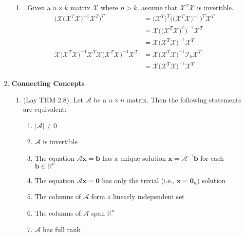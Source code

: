 \documentclass[12pt]{article}
\begin{document}
\begin{enumerate}
\begin{enumerate}
	\item\underline{}. Given a $n \times k$ matrix $\mathcal{X}$ where $n>k$, assume that $\mathcal{X}^T \mathcal{X}$ is invertible. 
		\begin{align*}
			\Big( \mathcal{X} \big(\mathcal{X}^T \mathcal{X} \big)^{-1} \mathcal{X}^T \Big)^T &= \big(\mathcal{X}^T\big)^T \Big( \big(\mathcal{X}^T \mathcal{X} \big)^{-1} \Big)^{T} \mathcal{X}^T \\ 
			& = \mathcal{X} \Big( \big(\mathcal{X}^T \mathcal{X} \big)^{T} \Big)^{-1} \mathcal{X}^T \\ 
			& = \mathcal{X} \big(\mathcal{X}^T \mathcal{X} \big)^{-1} \mathcal{X}^T \tag{Symmetric} \\
			\mathcal{X} \big(\mathcal{X}^T \mathcal{X} \big)^{-1} \mathcal{X}^T \mathcal{X} \big(\mathcal{X}^T \mathcal{X} \big)^{-1} \mathcal{X}^T  &= \mathcal{X} \big(\mathcal{X}^T \mathcal{X} \big)^{-1} \mathcal{I}_k \mathcal{X}^T \\
			& = \mathcal{X} \big(\mathcal{X}^T \mathcal{X} \big)^{-1} \mathcal{X}^T  \tag{Idempotent} 
		\end{align*}

	\end{enumerate}

\newpage

\item\textbf{Connecting Concepts}
	\begin{enumerate}
	\item\underline{} (Lay THM 2.8).
		Let $\mathcal{A}$ be a $n\times n$ matrix. Then the following statements are equivalent:
		\begin{enumerate}
		\item $|\mathcal{A}|\neq0$
		\item $\mathcal{A}$ is invertible
		\item The equation $\mathcal{A}\mathbf{x}=\mathbf{b}$ has a unique solution $\mathbf{x}=\mathcal{A}^{-1}\mathbf{b}$ for each $\mathbf{b}\in\mathbb{R}^n$
		\item The equation $\mathcal{A}\mathbf{x}=\mathbf{0}$ has only the trivial (i.e., $\mathbf{x}=\mathbf{0}_n$) solution
		\item The columns of $\mathcal{A}$ form a linearly independent set
		\item The columns of $\mathcal{A}$ span $\mathbb{R}^n$
		\item $\mathcal{A}$ has full rank
		\end{enumerate}


\end{enumerate}
\end{enumerate}
\end{document}
